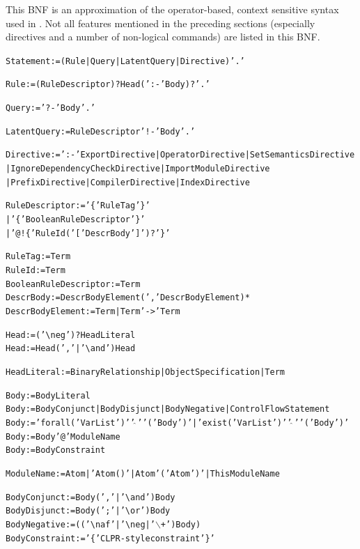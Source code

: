 \documentclass[11pt]{article}
\newcommand{\ERGO}{\mbox{\smaller{\ensuremath{\cal{E}}\smaller{{\sc{RGO}}}}}\xspace}
\newcommand{\FLSYSTEM}{\ERGO}
\newcommand{\bs}{\textbackslash}
\newcommand{\RULELOGNAF}{{\texttt{{\bs}naf}}\xspace}
\newcommand{\RULELOGNEG}{{\texttt{{\bs}neg}}\xspace}
\begin{document}
This BNF is an approximation of the operator-based,
context sensitive syntax used in \FLSYSTEM. Not all features mentioned in
the preceding sections (especially directives and a number of
non-logical commands) are listed in this BNF.

{\small
\begin{alltt}

Statement := (Rule | Query | LatentQuery | Directive) '.'

Rule := (RuleDescriptor)? Head (':-' Body)? '.'

Query := '?-' Body '.'

LatentQuery := RuleDescriptor '!-' Body '.'

Directive := ':-' ExportDirective | OperatorDirective | SetSemanticsDirective
	             | IgnoreDependencyCheckDirective | ImportModuleDirective
                     | PrefixDirective | CompilerDirective | IndexDirective

RuleDescriptor := '\@\{' RuleTag '\}'
                  | '\@\@\{' BooleanRuleDescriptor '\}'
                  | '@!\{' RuleId ( '[' DescrBody ']' )? '\}'

RuleTag := Term
RuleId := Term
BooleanRuleDescriptor := Term
DescrBody := DescrBodyElement (',' DescrBodyElement)*
DescrBodyElement := Term | Term '->' Term

Head := ('\RULELOGNEG')? HeadLiteral
Head := Head (',' | '\bs{}and') Head

HeadLiteral := BinaryRelationship | ObjectSpecification | Term

Body := BodyLiteral
Body := BodyConjunct | BodyDisjunct | BodyNegative | ControlFlowStatement
Body := 'forall(' VarList ')' '\ensuremath{\widehat{\ }}' '(' Body ')' | 'exist(' VarList ')' '\ensuremath{\widehat{\ }}' '(' Body ')'
Body := Body '@' ModuleName
Body := BodyConstraint

ModuleName := Atom | 'Atom()' | Atom '(' Atom ')' | ThisModuleName

BodyConjunct := Body (',' | '\bs{}and') Body
BodyDisjunct := Body (';' | '\bs{}or') Body
BodyNegative := (('\RULELOGNAF' | '\RULELOGNEG | '\ensuremath{\backslash}+') Body)
BodyConstraint := '\{' CLPR-style constraint '\}'


\end{alltt}}
\end{document}
